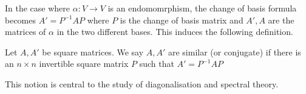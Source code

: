 In the case where $\alpha:V\to V$ is an endomomrphism, the change of basis formula becomes $A'=P^{-1}AP$ where $P$ is the change of basis matrix and $A',A$ are the matrices of $\alpha$ in the two different bases.
This induces the following definition.
\begin{definition}
    Let $A,A'$ be square matrices.
    We say $A,A'$ are similar (or conjugate) if there is an $n\times n$ invertible square matrix $P$ such that $A'=P^{-1}AP$
\end{definition}
This notion is central to the study of diagonalisation and spectral theory.